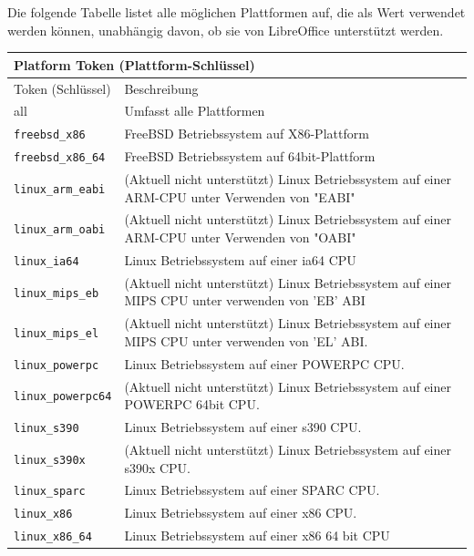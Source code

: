 \documentclass[a4paper,10pt,pagesize,titlepage]{scrbook}
\begin{document}
Die folgende Tabelle listet alle möglichen Plattformen auf, die als Wert verwendet werden können, unabhängig davon, ob sie von LibreOffice unterstützt werden.\linebreak


\begin{tabular}{ |p{3cm}|p{9cm} | }
	
	\multicolumn{2}{l}{\textbf{Platform Token (Plattform-Schlüssel)}}\\
	\toprule
	\rowcolor{hellgrau}
	Token (Schlüssel)& Beschreibung\\
	\hline
	all   & Umfasst alle Plattformen\\
	\hline
    \verb|freebsd_x86|& FreeBSD Betriebssystem auf X86-Plattform\\
    \hline
    \verb|freebsd_x86_64|& FreeBSD Betriebssystem auf 64bit-Plattform\\
    \hline
    \verb|linux_arm_eabi|& (Aktuell nicht unterstützt) Linux Betriebssystem auf einer ARM-CPU unter Verwenden von "EABI"\\
    \hline
    \verb|linux_arm_oabi|& (Aktuell nicht unterstützt) Linux Betriebssystem auf einer ARM-CPU unter Verwenden von "OABI"\\
    \hline
    \verb|linux_ia64| &	Linux Betriebssystem auf einer ia64 CPU\\
    \hline
    \verb|linux_mips_eb| &	(Aktuell nicht unterstützt) Linux Betriebssystem auf einer MIPS CPU unter verwenden von 'EB' ABI\\
    \hline
    \verb|linux_mips_el| &	(Aktuell nicht unterstützt) Linux Betriebssystem auf einer MIPS CPU unter verwenden von 'EL' ABI.\\
    \hline
    \verb|linux_powerpc| &	Linux Betriebssystem auf einer POWERPC CPU.\\
    \hline
    \verb|linux_powerpc64| & (Aktuell nicht unterstützt) Linux Betriebssystem auf einer POWERPC 64bit CPU.\\
    \hline
    \verb|linux_s390| &	Linux Betriebssystem auf einer s390 CPU.\\
    \hline
    \verb|linux_s390x| & (Aktuell nicht unterstützt) Linux Betriebssystem auf einer s390x CPU.\\
    \hline
    \verb|linux_sparc| & Linux Betriebssystem auf einer SPARC CPU.\\
    \hline
    \verb|linux_x86| &	Linux Betriebssystem auf einer x86 CPU.\\
    \hline
    \verb|linux_x86_64| & Linux Betriebssystem auf einer x86 64 bit CPU\\

\end{tabular}
\end{document}
